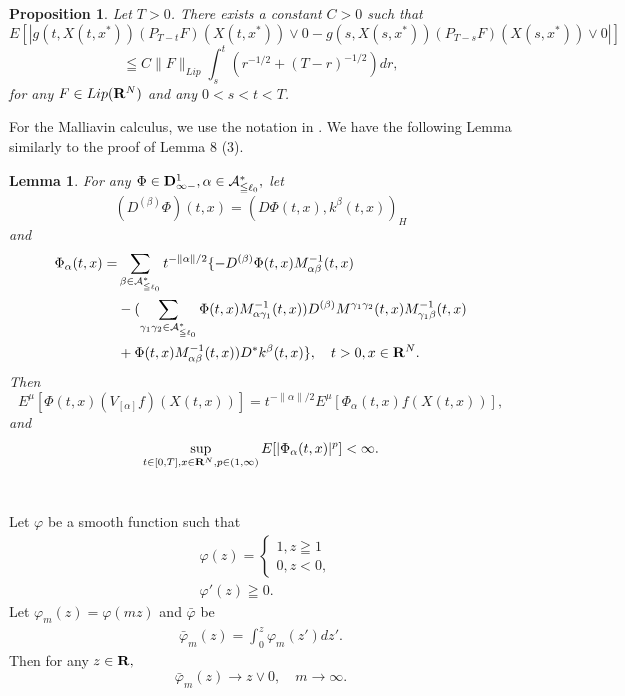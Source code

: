 \documentclass[12pt]{article}
\newtheorem{prop}[thm]{Proposition}%
\newtheorem{lem}[thm]{Lemma}%
\begin{document}
\begin{prop}\label{discProp}
Let $T>0$. There exists a constant $C >0$ such that
$$E[|g(t,X(t,x^*))(P_{T-t}F)(X(t,x^*)) \vee 0 - g(s,X(s,x^*))(P_{T-s}F)(X(s,x^*)) \vee 0|]$$
$$\leqq C \|F\|_{{Lip}} \int_{s}^t(r^{-1/2}+(T-r)^{-1/2})dr ,$$
for any $ F \in Lip({\bf R}^{N})$ and any $0< s < t< T$.
\end{prop}
For the Malliavin calculus, 
we use the notation in \cite{K}.
We have the following Lemma similarly to the proof of \cite{K} Lemma 8 (3).  
\begin{lem} \label{rev}
For any $\Phi \in {\bf D}_{\infty-}^1, \alpha \in \mathcal{A}^*_{\leqq \ell_0},$ let
$$(D^{(\beta)} \Phi)(t,x)=(D \Phi(t,x), k^{\beta}(t,x))_H$$
and
\begin{align*}
\Phi_{\alpha}(t,x)=&\sum_{\beta \in \mathcal{A}^*_{\leqq \ell_0}} t^{-\|\alpha\| / 2}\{ -D^{(\beta)} \Phi(t,x)M_{\alpha \beta}^{-1}(t,x) \\
&-(\sum_{\gamma_1 \gamma_2 \in \mathcal{A}^*_{\leqq \ell_0}} \Phi(t,x) M_{\alpha \gamma_1}^{-1}(t,x)) D^{(\beta )}
M^{\gamma_1 \gamma_2}(t,x) M_{\gamma_1 \beta}^{-1}(t,x) \\
&+ \Phi(t,x) M_{\alpha \beta}^{-1}(t,x)) D^* k^{\beta}(t,x) \}, \quad t>0, x \in {\bf R}^{N}.
\end{align*}
Then 
$$
E^{\mu}[\Phi(t,x) (V_{[\alpha]}f )(X(t,x))] = t^{-\|\alpha\| / 2}E^{\mu}[\Phi_{\alpha}(t,x) f(X(t,x))],
$$
and
$$\sup_{t\in[0,T], x \in {\bf R}^N, p\in (1, \infty)} E[|\Phi_{\alpha}(t,x)|^p] < \infty.$$
\\
\end{lem}

Let $\varphi$ be a smooth function such that
\begin{align}
&\varphi(z)=
\begin{cases}
1 , z\geqq 1\\
0, z<0,
\end{cases}\\
&\varphi' (z) \geqq 0.
\end{align} 
Let $\varphi_m(z)=\varphi(mz)$ and $\bar{\varphi}$ be 
\begin{align} \label{defPhi}
\bar{\varphi}_m(z)=\int_{0}^z \varphi_m(z')dz'.
\end{align}
Then for any $z \in {\bf R},$
$$\bar{\varphi}_m(z) \to z \vee 0 , \quad m\to \infty.$$ 
\end{document}
